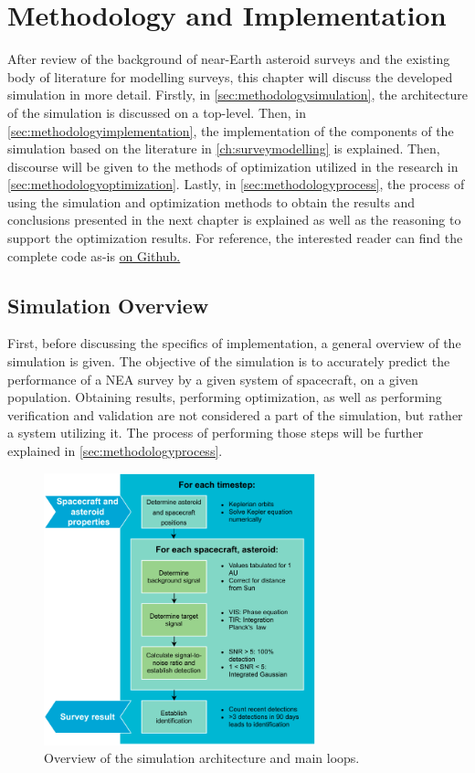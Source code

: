 \chapter{Methodology and Implementation}
\label{ch:experimental}
After review of the background of near-Earth asteroid surveys and the existing body of literature for modelling surveys, this chapter will discuss the developed simulation in more detail. Firstly, in \autoref{sec:methodologysimulation}, the architecture of the simulation is discussed on a top-level. Then, in \autoref{sec:methodologyimplementation}, the implementation of the components of the simulation based on the literature in \autoref{ch:surveymodelling} is explained. Then, discourse will be given to the methods of optimization utilized in the research in \autoref{sec:methodologyoptimization}. Lastly, in \autoref{sec:methodologyprocess}, the process of using the simulation and optimization methods to obtain the results and conclusions presented in the next chapter is explained as well as the reasoning to support the optimization results. For reference, the interested reader can find the complete code as-is \href{https://github.com/ArjanVermeulen97/thesis-code.git}{on Github.}

\section{Simulation Overview}
\label{sec:methodologysimulation}
First, before discussing the specifics of implementation, a general overview of the simulation is given. The objective of the simulation is to accurately predict the performance of a NEA survey by a given system of spacecraft, on a given population. Obtaining results, performing optimization, as well as performing verification and validation are not considered a part of the simulation, but rather a system utilizing it. The process of performing those steps will be further explained in \autoref{sec:methodologyprocess}.

\begin{figure}[htbp]
 \centering
 \includegraphics[width=0.7\textwidth]{img/simulation_overview.pdf}
 \caption{Overview of the simulation architecture and main loops.}
 \label{fig:simulation_overview}
\end{figure}

